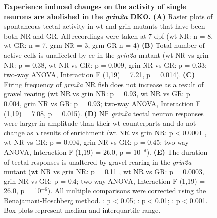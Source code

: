 \begin{figure}[!ht]
            \caption[\label{fig:R2_F6} \textbf{Experience induced changes on the activity of single neurons are abolished in the \textit{grin2a} DKO.}]{\label{fig:R2_F6} \textbf{Experience induced changes on the activity of single neurons are abolished in the \textit{grin2a} DKO. (A)} Raster plots of spontaneous tectal activity in \gls{wt} and \gls{grin} mutants that have been both NR and GR. All recordings were taken at 7 \gls{dpf} (\gls{wt} NR: n = 8, \gls{wt} GR: n = 7, \gls{grin} NR = 3, \gls{grin} GR n = 4) \textbf{(B)} Total number of active cells is unaffected by \gls{ee} in the \textit{grin2a} mutant (\gls{wt} NR vs \gls{grin} NR:  p = 0.38, \gls{wt} NR vs GR: p = 0.009, \gls{grin} NR vs GR: p = 0.33;  two-way ANOVA, Interaction F (1,19) = 7.21, p = 0.014). \textbf{(C)} Firing frequency of \textit{grin2a} NR fish does not increase as a result of gravel rearing (\gls{wt} NR vs \gls{grin} NR:  p = 0.93, \gls{wt} NR vs GR: p = 0.004, \gls{grin} NR vs GR: p = 0.93;  two-way ANOVA, Interaction F (1,19) = 7.08, p = 0.015). \textbf{(D)} NR \textit{grin2a} tectal neuron responses were larger in amplitude than their \gls{wt} counterparts and do not change as a results of enrichment (\gls{wt} NR vs \gls{grin} NR:  p < 0.0001 , \gls{wt} NR vs GR: p = 0.004, \gls{grin} NR vs GR: p = 0.45;  two-way ANOVA, Interaction F (1,19) = 26.0, p = 10$^{-6}$). \textbf{(E)} The duration of tectal responses is unaltered by gravel rearing in the \textit{grin2a} mutant  (\gls{wt} NR vs \gls{grin} NR: p = 0.11 , \gls{wt} NR vs GR: p = 0.0003, \gls{grin} NR vs GR: p = 0.4;  two-way ANOVA, Interaction F (1,19) = 26.0, p = 10$^{-6}$).  All multiple comparisons were corrected using the Benajamani-Hoschberg method. \text{*} : p < 0.05; \text{**} : p < 0.01; \text{***}: p < 0.001. Box plots represent
            median and interquartile range.}
     \end{figure}

